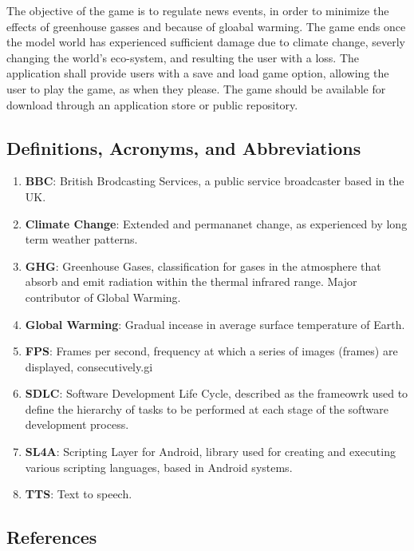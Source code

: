 \documentclass[]{article}
\begin{document}
The objective of the game is to regulate news events, in order to minimize the effects of greenhouse gasses and because of gloabal warming. The game ends once the model world has experienced sufficient damage due to climate change, severly changing the world's eco-system, and resulting the user with a loss. The application shall provide users with a save and load game option, allowing the user to play the game, as when they please. The game should be available for download through an application store or public repository.	

\subsection{Definitions, Acronyms, and Abbreviations}
\label{sub:definitions_acronyms_and_abbreviations}
\begin{enumerate}
\item \textbf{BBC}: British Brodcasting Services, a public service broadcaster based in the UK.
\item \textbf{Climate Change}: Extended and permananet change, as experienced by long term weather patterns.
\item \textbf{GHG}: Greenhouse Gases, classification for gases in the atmosphere that absorb and emit radiation within the thermal infrared range. Major contributor of Global Warming.
\item \textbf{Global Warming}: Gradual incease in average surface temperature of Earth.
\item\textbf{FPS}: Frames per second,  frequency at which a series of images (frames) are displayed, consecutively.gi
\item \textbf{SDLC}: Software Development Life Cycle, described as the frameowrk used to define the hierarchy of tasks to be performed at each stage of the software development process.
\item \textbf{SL4A}:  Scripting Layer for Android, library used for creating and executing various scripting languages, based in Android systems.
\item \textbf{TTS}: Text to speech.
\end{enumerate}

\subsection{References}
\label{sub:references}


\end{document}
